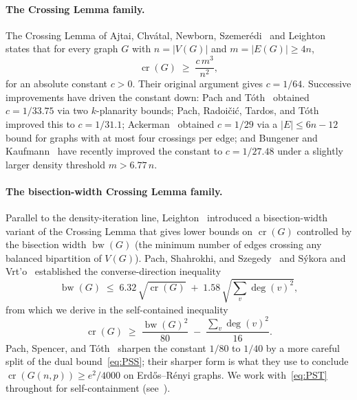 \documentclass[11pt,a4paper]{article}
\theoremstyle{definition}
\DeclareMathOperator{\crN}{cr}
\DeclareMathOperator{\bw}{bw}
\begin{document}
\paragraph{The Crossing Lemma family.}
The Crossing Lemma of Ajtai, Chv\'atal, Newborn,
Szemer\'edi~\cite{ACNS} and Leighton~\cite{Leighton83} states that
for every graph $G$ with $n = |V(G)|$ and $m = |E(G)| \ge 4n$,
\begin{equation}\label{eq:CL-classical}
   \crN(G) \;\ge\; \frac{c\,m^{3}}{n^{2}},
\end{equation}
for an absolute constant $c > 0$. Their original argument gives
$c = 1/64$. Successive improvements have driven the constant down:
Pach and T\'oth~\cite{PachToth97} obtained $c = 1/33.75$ via two
$k$-planarity bounds; Pach, Radoi\v{c}i\'c, Tardos, and
T\'oth~\cite{PRTT} improved this to $c = 1/31.1$; Ackerman~\cite{Ackerman}
obtained $c = 1/29$ via a $|E| \le 6n - 12$ bound for graphs with at
most four crossings per edge; and Bungener and Kaufmann~\cite{BK24}
have recently improved the constant to $c = 1/27.48$ under a
slightly larger density threshold $m > 6.77\,n$.

\paragraph{The bisection-width Crossing Lemma family.}
Parallel to the density-iteration line, Leighton~\cite{Leighton84}
introduced a bisection-width variant of the Crossing Lemma that
gives lower bounds on $\crN(G)$ controlled by the bisection width
$\bw(G)$ (the minimum number of edges crossing any balanced
bipartition of $V(G)$). Pach, Shahrokhi, and
Szegedy~\cite{PachShahrokhiSzegedy} and Sýkora and Vrt'o~\cite{SykoraVrto}
established the converse-direction inequality
\begin{equation}\label{eq:PSS}
   \bw(G) \;\le\; 6.32\,\sqrt{\crN(G)} \;+\; 1.58\,\sqrt{\textstyle\sum_v \deg(v)^{2}},
\end{equation}
from which we derive in  the self-contained
inequality
\begin{equation}\label{eq:PST}
   \crN(G) \;\ge\; \frac{\bw(G)^{2}}{80} \;-\; \frac{\sum_v \deg(v)^{2}}{16}.
\end{equation}
Pach, Spencer, and T\'oth~\cite{PachSpencerToth} sharpen the
constant $1/80$ to $1/40$ by a more careful split of the dual
bound~\eqref{eq:PSS}; their sharper form is what they use to
conclude $\crN(G(n, p)) \ge e^{2}/4000$ on Erd\H{o}s--R\'enyi
graphs. We work with~\eqref{eq:PST} throughout for self-containment
(see~).
\end{document}
